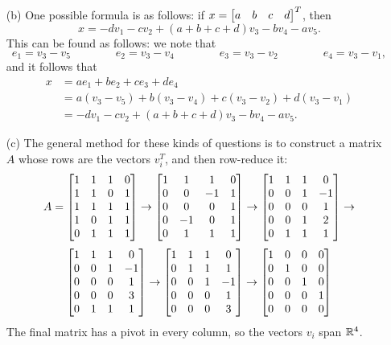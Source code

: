 \documentclass[a4paper]{amsart}
\renewenvironment{solution}{\SolutionInline}{\endSolutionInline}
\begin{document}
\begin{solution}
\begin{itemize}
\begin{align*}
   \end{align*}
  \item[(b)] One possible formula is as follows: if
   $x=\left[\begin{matrix} a & b & c & d\end{matrix}\right]^T$, then
   \[ x = -dv_1 -cv_2 +(a+b+c+d)v_3 - bv_4 -av_5. \]
   This can be found as follows: we note that
   \[ e_1 = v_3 - v_5 \hspace{4em}
      e_2 = v_3 - v_4 \hspace{4em}
      e_3 = v_3 - v_2 \hspace{4em}
      e_4 = v_3 - v_1,
   \]
   and it follows that
   \begin{align*}
    x &= a e_1 + b e_2 + c e_3 + d e_4 \\
      &= a(v_3-v_5) + b(v_3-v_4) + c(v_3-v_2) + d(v_3-v_1) \\
      &= -dv_1 -cv_2 +(a+b+c+d)v_3 - bv_4 -av_5.
   \end{align*}
  \item[(c)] The general method for these kinds of questions is to
   construct a matrix $A$ whose rows are the vectors $v_i^T$, and then
   row-reduce it:
   \[ A = \left[\begin{matrix} 1 & 1 & 1 & 0 \\ 
               1 & 1 & 0 & 1 \\
               1 & 1 & 1 & 1 \\
               1 & 0 & 1 & 1 \\
               0 & 1 & 1 & 1 \end{matrix}\right] \to
          \left[\begin{matrix} 1 & 1 & 1 & 0 \\ 
               0 & 0 &-1 & 1 \\
               0 & 0 & 0 & 1 \\
               0 &-1 & 0 & 1 \\
               0 & 1 & 1 & 1 \end{matrix}\right] \to
          \left[\begin{matrix} 1 & 1 & 1 & 0 \\ 
               0 & 0 & 1 &-1 \\
               0 & 0 & 0 & 1 \\
               0 & 0 & 1 & 2 \\
               0 & 1 & 1 & 1 \end{matrix}\right] \to
   \] \[
          \left[\begin{matrix} 1 & 1 & 1 & 0 \\ 
               0 & 0 & 1 &-1 \\
               0 & 0 & 0 & 1 \\
               0 & 0 & 0 & 3 \\
               0 & 1 & 1 & 1 \end{matrix}\right] \to
          \left[\begin{matrix} 1 & 1 & 1 & 0 \\ 
               0 & 1 & 1 & 1 \\
               0 & 0 & 1 &-1 \\
               0 & 0 & 0 & 1 \\
               0 & 0 & 0 & 3 \end{matrix}\right] \to
          \left[\begin{matrix} 1 & 0 & 0 & 0 \\ 
               0 & 1 & 0 & 0 \\
               0 & 0 & 1 & 0 \\
               0 & 0 & 0 & 1 \\
               0 & 0 & 0 & 0 \end{matrix}\right]
   \]
   The final matrix has a pivot in every column, so the vectors $v_i$
   span ${\mathbb{R}}^4$. 
 \end{itemize}
\end{solution}
\end{document}
